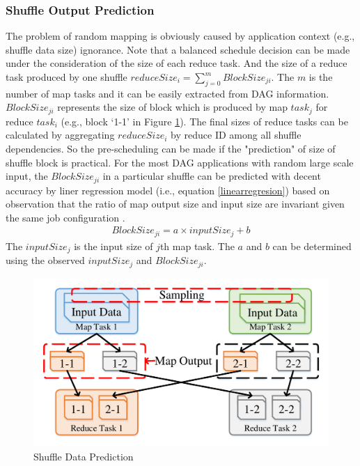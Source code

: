 \subsubsection{Shuffle Output Prediction}\label{shuffleprediction}
\ifrevision
{}
\fi
The problem of random mapping is obviously caused by application context (e.g., shuffle data size) ignorance. 
Note that a balanced schedule decision can be made under the consideration of the size of each reduce task. 
And the size of a reduce task produced by one shuffle $reduceSize_i = \sum_{j=0}^{m} {BlockSize_{ji}}$. 
The $m$ is the number of map tasks and it can be easily extracted from DAG information. 
$BlockSize_{ji}$ represents the size of block which is produced by map $task_j$ for reduce $task_i$ (e.g., block `1-1' in Figure \ref{fig:shuffle}). 
The final sizes of reduce tasks can be calculated by aggregating $reduceSize_i$ by reduce ID among all shuffle dependencies. 
So the pre-scheduling can be made if the "prediction" of size of shuffle block is practical.
\ifrevision
\reversemarginpar
{}
\fi
For the most DAG applications with random large scale input, 
the $BlockSize_{ji}$ in a particular shuffle can be predicted with decent accuracy by liner regression model (i.e., equation \ref{linearregresion}) based on observation that the ratio of map output size and input size are invariant given the same job configuration \cite{ishuffle, predict}.
\begin{equation}
\label{linearregresion}
\begin{aligned}
	BlockSize_{ji} = a \times inputSize_j + b
\end{aligned}
\end{equation}
The $inputSize_j$ is the input size of $j$th map task. 
The $a$ and $b$ can be determined using the observed $inputSize_j$ and $BlockSize_{ji}$.
\begin{figure}
	\centering
	\includegraphics[width=0.75\linewidth]{fig/shuffle}
	\caption{Shuffle Data Prediction}
	\label{fig:shuffle}
	\vspace{-1em}
\end{figure}
